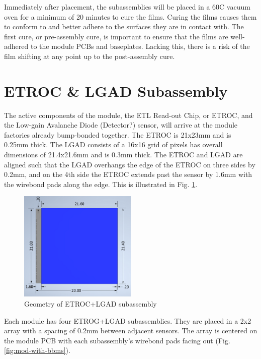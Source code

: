 \documentclass[10pt]{datasheet}
\begin{document}
Immediately after placement, the subassemblies will be placed in a 60\degree C vacuum oven for a minimum of 20 minutes to cure the films. Curing the films causes them to conform to and better adhere to the surfaces they are in contact with. The first cure, or pre-assembly cure, is important to ensure that the films are well-adhered to the module PCBs and baseplates. Lacking this, there is a risk of the film shifting at any point up to the post-assembly cure.

\section{ETROC \& LGAD Subassembly}

The active components of the module, the ETL Read-out Chip, or ETROC, and the Low-gain Avalanche Diode (Detector?) sensor, will arrive at the module factories already bump-bonded together. The ETROC is 21x23mm and is 0.25mm thick. The LGAD consists of a 16x16 grid of pixels has overall dimensions of 21.4x21.6mm and is 0.3mm thick. The ETROC and LGAD are aligned such that the LGAD overhangs the edge of the ETROC on three sides by 0.2mm, and on the 4th side the ETROC extends past the sensor by 1.6mm with the wirebond pads along the edge. This is illustrated in Fig. \ref{fig:bbm-geometry}.

\begin{figure}[h]
	\centering
    \includegraphics[width=0.5\textwidth]{figures/ETROCpLGAD.png}
    \caption{Geometry of ETROC+LGAD subassembly}
    \label{fig:bbm-geometry}	
\end{figure}

Each module has four ETROG+LGAD subassemblies. They are placed in a 2x2 array with a spacing of 0.2mm between adjacent sensors. The array is centered on the module PCB with each subassembly's wirebond pads facing out (Fig. \ref{fig:mod-with-bbms}).
\end{document}
